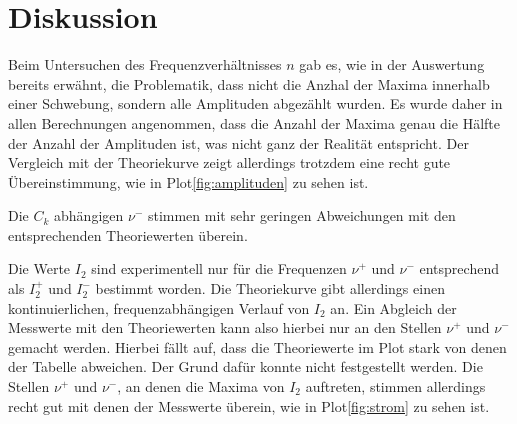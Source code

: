 \section{Diskussion}
\label{sec:Diskussion}

Beim Untersuchen des Frequenzverhältnisses $n$ gab es, wie in der Auswertung bereits erwähnt, die Problematik, dass nicht die Anzhal der 
Maxima innerhalb einer Schwebung, sondern alle Amplituden abgezählt wurden. Es wurde daher in allen Berechnungen angenommen, dass die 
Anzahl der Maxima genau die Hälfte der Anzahl der Amplituden ist, was nicht ganz der Realität entspricht. Der Vergleich mit der 
Theoriekurve zeigt allerdings trotzdem eine recht gute Übereinstimmung, wie in Plot\ref{fig:amplituden} zu sehen ist.

Die $C_k$ abhängigen $\nu^-$ stimmen mit sehr geringen Abweichungen mit den entsprechenden Theoriewerten überein.

Die Werte $I_2$ sind experimentell nur für die Frequenzen $\nu^+$ und $\nu^-$ entsprechend als $I_2^+$ und $I_2^-$ bestimmt worden.
Die Theoriekurve gibt allerdings einen kontinuierlichen, frequenzabhängigen Verlauf von $I_2$ an. Ein Abgleich der Messwerte mit den 
Theoriewerten kann also hierbei nur an den Stellen $\nu^+$ und $\nu^-$ gemacht werden. Hierbei fällt auf, dass die Theoriewerte im 
Plot stark von denen der Tabelle abweichen. Der Grund dafür konnte nicht festgestellt werden. Die Stellen $\nu^+$ und $\nu^-$, an denen die Maxima von 
$I_2$ auftreten, stimmen allerdings recht gut mit denen der Messwerte überein, wie in Plot\ref{fig:strom} zu sehen ist.

